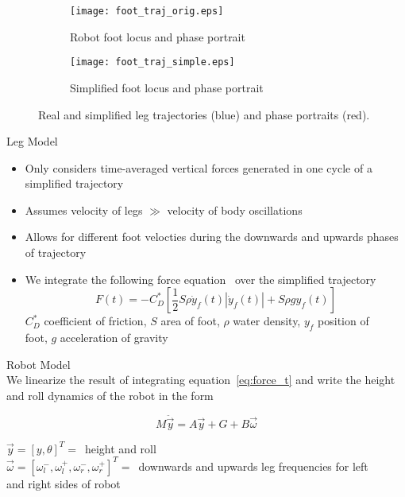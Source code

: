 \begin{figure}[tb]
\centering
\begin{subfigure}[t]{0.47\textwidth}
    \centering
    \texttt{[image: foot\_traj\_orig.eps]}
    \caption{Robot foot locus and phase portrait}
    \label{fig:trajrob}
\end{subfigure}
\quad
\begin{subfigure}[t]{0.47\textwidth}
    \centering
    \texttt{[image: foot\_traj\_simple.eps]}
    \caption{Simplified foot locus and phase portrait} 
    \label{fig:trajsimp}
\end{subfigure}
\vspace{0.5EX}
\caption{Real and simplified leg trajectories (blue) and phase portraits (red).}
\label{fig:traj}
\end{figure}
\vspace{2EX}

\textcolor{prime}{\textsf{Leg Model}}
\begin{itemize}
    \item Only considers time-averaged vertical forces generated in one cycle of a simplified trajectory
    \item Assumes velocity of legs $\gg$ velocity of body oscillations
    \item Allows for different foot velocties during the downwards and upwards phases of trajectory
    \item We integrate the following force equation~\cite{glasheen1996vertical} over the simplified trajectory
        \begin{equation}
            F(t) = - C_D^* \left[\frac{1}{2} S \rho \dot{y}_f(t) |\dot{y}_f(t) | + S \rho g y_f(t) \right]
            \label{eq:force_t}
        \end{equation}
\hspace{1EM} $C_D^*$ coefficient of friction, $S$ area of foot, $\rho$ water density, $y_f$ position of \\ \hspace{1EM} foot, $g$ acceleration of gravity
\end{itemize}
\vspace{1EX}

\textcolor{prime}{\textsf{Robot Model}} \\
We linearize the result of integrating equation~\ref{eq:force_t} and write the height and roll dynamics of the robot in the form

\begin{equation}
    M \ddot{\vec{y}} = A \vec{y} + G + B \vec{\omega} 
    \label{eq:rob_dyn}
\end{equation}

\hspace{1EM} $\vec{y} = [y, \theta]^T = $\  height and roll \\

\hspace{1EM} $\vec{\omega} = [\omega^-_l, \omega^+_l, \omega^-_r, \omega^+_r]^T = $\ downwards and upwards leg frequencies for left \\ \hspace{1EM} and right sides of robot
